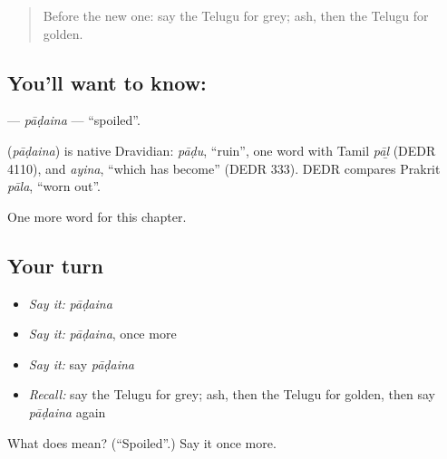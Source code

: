 \label{lesson:TE-C140-padaina}



\begin{quote}
Before the new one: say the Telugu for grey; ash, then the Telugu for golden.
\end{quote}

\subsection*{You'll want to know: }
\textbf{} — \emph{pāḍaina} — \textquotedblleft{}spoiled\textquotedblright{}.

\begin{cousinweb}
\textbf{} (\emph{pāḍaina}) is native Dravidian: \emph{pāḍu}, \textquotedblleft{}ruin\textquotedblright{}, one word with Tamil \emph{pāḻ} (DEDR 4110), and \emph{ayina}, \textquotedblleft{}which has become\textquotedblright{} (DEDR 333). DEDR compares Prakrit \emph{pāla}, \textquotedblleft{}worn out\textquotedblright{}.
\end{cousinweb}

\begin{grammarlens}[title={What you've built}]
One more word for this chapter.
\end{grammarlens}

\subsection*{Your turn}
\begin{itemize}
\raggedright
  \item \emph{Say it:} \emph{pāḍaina}
  \item \emph{Say it:} \emph{pāḍaina}, once more
  \item \emph{Say it:} say \emph{pāḍaina}
  \item \emph{Recall:} say the Telugu for grey; ash, then the Telugu for golden, then say \emph{pāḍaina} again
\end{itemize}

\begin{tcolorbox}[breakable,colback=teal!4,colframe=teal!35!black,title={Before you move on}]
What does  mean? (\textquotedblleft{}Spoiled\textquotedblright{}.) Say it once more.
\end{tcolorbox}

